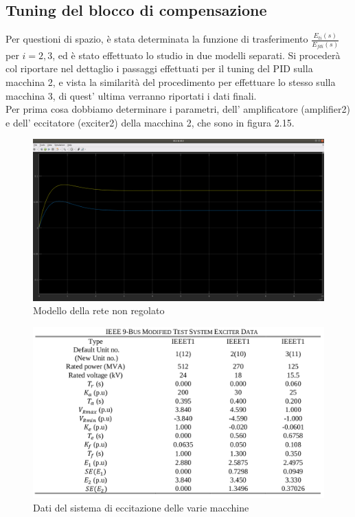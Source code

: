 \documentclass[Lau,noexaminfo]{sapthesis}
\begin{document}
	\subsection{Tuning del blocco di compensazione}
	Per questioni di spazio, è stata determinata la funzione di trasferimento $\frac{E_{ti}(s)}{E_{fdi}(s)}$ per $i=2,3$, ed è stato effettuato lo studio in due modelli separati. Si procederà col riportare nel dettaglio i passaggi effettuati per il tuning del PID sulla macchina 2, e vista la similarità del procedimento per effettuare lo stesso sulla macchina 3, di quest' ultima verranno riportati i dati finali.\\
	Per prima cosa dobbiamo determinare i parametri, dell' amplificatore (amplifier2) e dell' eccitatore (exciter2) della macchina 2, che sono in figura 2.15.\\
	\begin{figure}
	\centering
	\includegraphics[height=0.4\textheight]{Uscita_non_regolata}
	\caption{Modello della rete non regolato}
	\end{figure}	
	\begin{figure}
	 	\centering
	 	\includegraphics[height=0.3\textheight]{Dati_Sistema_Eccitazione}	 	\caption{Dati del sistema di eccitazione delle varie macchine}
	\end{figure}
\end{document}
